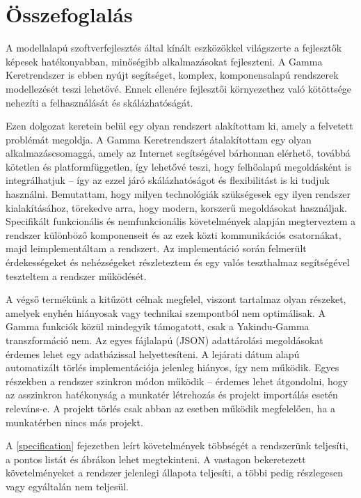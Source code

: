 \chapter{Összefoglalás}

A modellalapú szoftverfejlesztés által kínált eszközökkel világszerte a fejlesztők képesek hatékonyabban, minőségibb alkalmazásokat fejleszteni. A Gamma Keretrendszer is ebben nyújt segítséget, komplex, komponensalapú rendszerek modellezését teszi lehetővé. Ennek ellenére fejlesztői környezethez való kötöttsége nehezíti a felhasználását és skálázhatóságát.

Ezen dolgozat keretein belül egy olyan rendszert alakítottam ki, amely a felvetett problémát megoldja. A Gamma Keretrendszert átalakítottam egy olyan alkalmazáscsomaggá, amely az Internet segítségével bárhonnan elérhető, továbbá kötetlen és platformfüggetlen, így lehetővé teszi, hogy felhőalapú megoldásként is integrálhatjuk -- így az ezzel járó skálázhatóságot és flexibilitást is ki tudjuk használni. 
Bemutattam, hogy milyen technológiák szükségesek egy ilyen rendszer kialakításához, törekedve arra, hogy modern, korszerű megoldásokat használjak. Specifikált funkcionális és nemfunkcionális követelmények alapján megterveztem a rendszer különböző komponenseit és az ezek közti kommunikációs csatornákat, majd leimplementáltam a rendszert. Az implementáció során felmerült érdekességeket és nehézségeket részleteztem és egy valós teszthalmaz segítségével teszteltem a rendszer működését.

A végső termékünk a kitűzött célnak megfelel, viszont tartalmaz olyan részeket, amelyek enyhén hiányosak vagy technikai szempontból nem optimálisak. A Gamma funkciók közül mindegyik támogatott, csak a Yakindu-Gamma transzformáció nem. Az egyes fájlalapú (JSON) adattárolási megoldásokat érdemes lehet egy adatbázissal helyettesíteni. A lejárati dátum alapú automatizált törlés implementációja jelenleg hiányos, így nem működik. Egyes részekben a rendszer szinkron módon működik -- érdemes lehet átgondolni, hogy az asszinkron hatékonyság a munkatér létrehozás és projekt importálás esetén releváns-e. A projekt törlés csak abban az esetben működik megfelelően, ha a munkatérben nincs más projekt.

 
A \ref{specification} fejezetben leírt követelmények többségét a rendszerünk teljesíti, a pontos listát  és  ábrákon lehet megtekinteni. A vastagon bekeretezett követelményeket a rendszer jelenlegi állapota teljesíti, a többi pedig részlegesen vagy egyáltalán nem teljesül.

